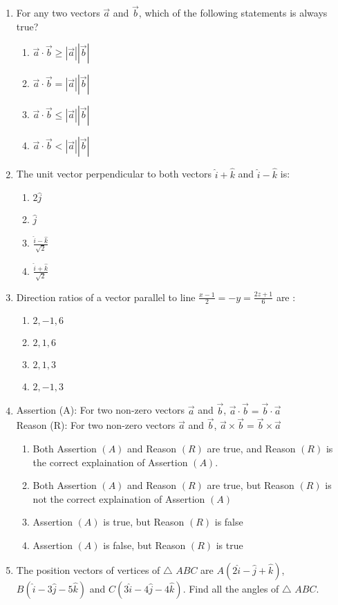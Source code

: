 \documentclass{article}
\begin{document}
\begin{enumerate}
	\item For any two vectors $\overrightarrow{a}$ and $\overrightarrow{b}$, which of the following statements is always true?
		\begin{enumerate}
			\item $\overrightarrow{a} \cdot \overrightarrow{b} \geq |\overrightarrow{a}||\overrightarrow{b}|$
			\item $\overrightarrow{a} \cdot \overrightarrow{b} = |\overrightarrow{a}||\overrightarrow{b}|$
			\item $\overrightarrow{a} \cdot \overrightarrow{b} \leq |\overrightarrow{a}||\overrightarrow{b}|$
			\item $\overrightarrow{a} \cdot \overrightarrow{b} < |\overrightarrow{a}||\overrightarrow{b}|$
		\end{enumerate}
	\item The unit vector perpendicular to both vectors $\hat{i} + \hat{k}$ and $\hat{i} - \hat{k}$ is:
		\begin{enumerate}
			\item $2\hat{j}$
			\item $\hat{j}$
			\item $\frac{\hat{i} - \hat{k}}{\sqrt{2}}$
			\item $\frac{\hat{i} + \hat{k}}{\sqrt{2}}$
		\end{enumerate}
	\item Direction ratios of a vector parallel to line $\frac{x - 1}{2}= -y = \frac{2z + 1}{6}$ are :
		\begin{enumerate}
			\item $2, -1, 6$
			\item $2, 1, 6$
			\item $2, 1, 3$
			\item $2, -1, 3$
		\end{enumerate}
	\item Assertion (A): For two non-zero vectors $\overrightarrow{a}$ and $\overrightarrow{b}$, $\overrightarrow{a} \cdot \overrightarrow{b} = \overrightarrow{b} \cdot \overrightarrow{a}$\\
		Reason (R): For two non-zero vectors $\overrightarrow{a}$ and $\overrightarrow{b}$, $\overrightarrow{a} \times \overrightarrow{b} = \overrightarrow{b} \times \overrightarrow{a}$
		\begin{enumerate}
			\item Both Assertion $(A)$ and Reason $(R)$ are true, and Reason $(R)$ is the correct explaination of Assertion $(A)$.
			\item Both Assertion $(A)$ and Reason $(R)$ are true, but Reason $(R)$ is not the correct explaination of Assertion $(A)$
			\item Assertion $(A)$ is true, but Reason $(R)$ is false
			\item Assertion $(A)$ is false, but Reason $(R)$ is true
		\end{enumerate}
	\item The position vectors of vertices of $\bigtriangleup$ $ABC$ are $A(2\hat{i} - \hat{j} + \hat{k})$, $B(\hat{i} - 3\hat{j} - 5\hat{k})$ and  $C(3\hat{i} - 4\hat{j} - 4\hat{k})$. Find all the angles of $\bigtriangleup$ $ABC$.
\end{enumerate}
\end{document}
